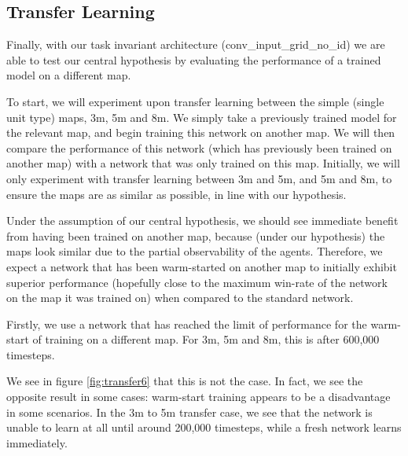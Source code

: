 \subsection{Transfer Learning}

Finally, with our task invariant architecture (conv\_input\_grid\_no\_id) we are able to test our central hypothesis by evaluating the performance of a trained model on a different map.

To start, we will experiment upon transfer learning between the simple (single unit type) maps, 3m, 5m and 8m. We simply take a previously trained model for the relevant map, and begin training this network on another map. We will then compare the performance of this network (which has previously been trained on another map) with a network that was only trained on this map. Initially, we will only experiment with transfer learning between 3m and 5m, and 5m and 8m, to ensure the maps are as similar as possible, in line with our hypothesis.

Under the assumption of our central hypothesis, we should see immediate benefit from having been trained on another map, because (under our hypothesis) the maps look similar due to the partial observability of the agents. Therefore, we expect a network that has been warm-started on another map to initially exhibit superior performance (hopefully close to the maximum win-rate of the network on the map it was trained on) when compared to the standard network.


Firstly, we use a network that has reached the limit of performance for the warm-start of training on a different map. For 3m, 5m and 8m, this is after 600,000 timesteps.


We see in figure \ref{fig:transfer6} that this is not the case. In fact, we see the opposite result in some cases: warm-start training appears to be a disadvantage in some scenarios. In the 3m to 5m transfer case, we see that the network is unable to learn at all until around 200,000 timesteps, while a fresh network learns immediately.

